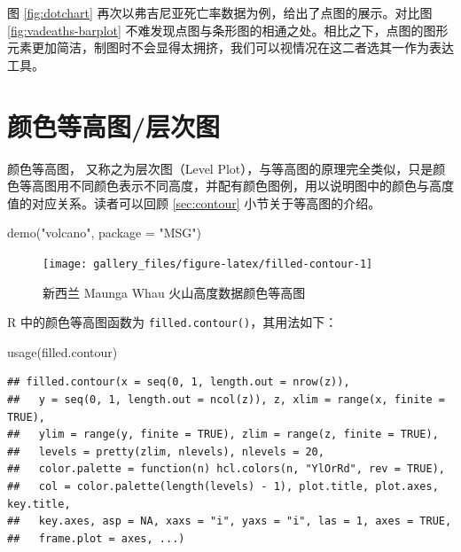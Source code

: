 \documentclass[
  b5paper,
  UTF8,twoside]{book}
\newenvironment{Shaded}{\begin{snugshade}}{\end{snugshade}}
\newcommand{\AttributeTok}[1]{\textcolor[rgb]{0.77,0.63,0.00}{#1}}
\newcommand{\FunctionTok}[1]{\textcolor[rgb]{0.00,0.00,0.00}{#1}}
\newcommand{\NormalTok}[1]{#1}
\newcommand{\StringTok}[1]{\textcolor[rgb]{0.31,0.60,0.02}{#1}}
\begin{document}
图 \ref{fig:dotchart} 再次以弗吉尼亚死亡率数据为例，给出了点图的展示。对比图 \ref{fig:vadeaths-barplot} 不难发现点图与条形图的相通之处。相比之下，点图的图形元素更加简洁，制图时不会显得太拥挤，我们可以视情况在这二者选其一作为表达工具。

\hypertarget{sec:filled-contour}{%
\section{颜色等高图/层次图}\label{sec:filled-contour}}

颜色等高图，\citet{Cleveland93} 又称之为层次图（Level Plot），与等高图的原理完全类似，只是颜色等高图用不同颜色表示不同高度，并配有颜色图例，用以说明图中的颜色与高度值的对应关系。读者可以回顾 \ref{sec:contour} 小节关于等高图的介绍。





\begin{Shaded}
\begin{Highlighting}[]
\FunctionTok{demo}\NormalTok{(}\StringTok{"volcano"}\NormalTok{, }\AttributeTok{package =} \StringTok{"MSG"}\NormalTok{)}
\end{Highlighting}
\end{Shaded}

\begin{figure}

{\centering \texttt{[image: gallery\_files/figure-latex/filled-contour-1]} 

}

\caption[新西兰 Maunga Whau 火山高度数据颜色等高图]{新西兰 Maunga Whau 火山高度数据颜色等高图}\label{fig:filled-contour}
\end{figure}

R 中的颜色等高图函数为 \texttt{filled.contour()}，其用法如下：

\begin{Shaded}
\begin{Highlighting}[]
\FunctionTok{usage}\NormalTok{(filled.contour)}
\end{Highlighting}
\end{Shaded}

\begin{verbatim}
## filled.contour(x = seq(0, 1, length.out = nrow(z)),
##   y = seq(0, 1, length.out = ncol(z)), z, xlim = range(x, finite = TRUE),
##   ylim = range(y, finite = TRUE), zlim = range(z, finite = TRUE),
##   levels = pretty(zlim, nlevels), nlevels = 20,
##   color.palette = function(n) hcl.colors(n, "YlOrRd", rev = TRUE),
##   col = color.palette(length(levels) - 1), plot.title, plot.axes, key.title,
##   key.axes, asp = NA, xaxs = "i", yaxs = "i", las = 1, axes = TRUE,
##   frame.plot = axes, ...)
\end{verbatim}
\end{document}
